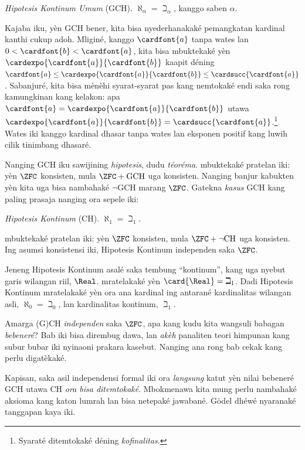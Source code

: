 \documentclass[../../../include/open-logic-section]{subfiles}
\begin{document}
\begin{defish}
\emph{Hipotesis Kontinum Umum} (GCH). $\aleph_\alpha  = \beth_\alpha$, kanggo saben $\alpha$.
\end{defish}

Kajaba iku, yèn GCH bener, kita bisa nyederhanakaké pemangkatan kardinal
kanthi cukup adoh. Mliginé, kanggo $\cardfont{a}$ tanpa wates lan
$0<\cardfont{b}<\cardfont{a}$, kita bisa mbuktekaké yèn
$\cardexpo{\cardfont{a}}{\cardfont{b}}$ kaapit déning
$\cardfont{a}\leq \cardexpo{\cardfont{a}}{\cardfont{b}} \leq
\cardsucc{\cardfont{a}}$. Sabanjuré, kita bisa mènèhi syarat-syarat
pas kang nemtokaké endi saka rong kamungkinan kang kelakon: apa
$\cardfont{a} = \cardexpo{\cardfont{a}}{\cardfont{b}}$ utawa
$\cardexpo{\cardfont{a}}{\cardfont{b}} =
\cardsucc{\cardfont{a}}$.\footnote{Syaraté ditemtokaké déning
\emph{kofinalitas}.}
Wates iki kanggo kardinal dhasar tanpa wates lan eksponen positif kang luwih cilik tinimbang dhasaré.

Nanging GCH iku sawijining \emph{hipotesis}, dudu \emph{téoréma}.
\citet{Godel1938} mbuktekaké pratelan iki: yèn $\ZFC$ konsisten, mula
$\ZFC + \text{GCH}$ uga konsisten. Nanging banjur kabukten yèn kita uga bisa
nambahaké $\lnot$GCH marang $\ZFC$. Gatekna \emph{kasus} GCH kang paling
prasaja nanging ora sepele iki:

\begin{defish}
\emph{Hipotesis Kontinum} (CH). $\aleph_1 = \beth_1$.
\end{defish}

\citet{Cohen1963} mbuktekaké pratelan iki: yèn $\ZFC$ konsisten, mula
$\ZFC + \lnot\text{CH}$ uga konsisten. Ing asumsi konsistensi iki, Hipotesis Kontinum independen
saka $\ZFC$.

Jeneng Hipotesis Kontinum asalé saka tembung ``kontinum'', kang uga
nyebut garis wilangan riil, $\Real$.
 mratelakaké yèn $\card{\Real} =
\beth_1$. Dadi Hipotesis Kontinum mratelakaké yèn ora ana kardinal
ing antarané kardinalitas wilangan asli, $\aleph_0 = \beth_0$,
lan kardinalitas kontinum, $\beth_1$.

Amarga (G)CH \emph{independen} saka $\ZFC$, apa kang kudu kita
wangsuli babagan \emph{bebeneré}? Bab iki bisa dirembug dawa,
lan \emph{akèh} panaliten teori himpunan kang subur bubar iki nyinaoni
prakara kasebut. Nanging ana rong bab cekak kang perlu digatèkaké.

Kapisan, saka asil independensi formal iki ora \emph{langsung}
katut yèn nilai bebeneré GCH utawa CH \emph{ora bisa ditemtokaké}.
Mbokmenawa kita mung perlu nambahaké aksioma kang katon lumrah
lan bisa netepaké jawabané. G\"odel dhéwé nyaranaké tanggapan kaya iki.
\end{document}
